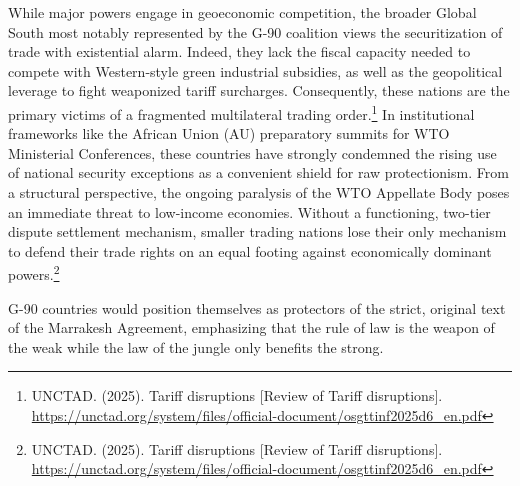 While major powers engage in geoeconomic competition, the broader Global South most notably represented by the G-90 coalition views the securitization of trade with existential alarm. Indeed, they lack the fiscal capacity needed to compete with Western-style green industrial subsidies, as well as the geopolitical leverage to fight weaponized tariff surcharges. Consequently, these nations are the primary victims of a fragmented multilateral trading order.\footnote{UNCTAD. (2025). Tariff disruptions [Review of Tariff disruptions]. \url{https://unctad.org/system/files/official-document/osgttinf2025d6_en.pdf}} In institutional frameworks like the African Union (AU) preparatory summits for WTO Ministerial Conferences, these countries have strongly condemned the rising use of national security exceptions as a convenient shield for raw protectionism. From a structural perspective, the ongoing paralysis of the WTO Appellate Body poses an immediate threat to low-income economies. Without a functioning, two-tier dispute settlement mechanism, smaller trading nations lose their only mechanism to defend their trade rights on an equal footing against economically dominant powers.\footnote{UNCTAD. (2025). Tariff disruptions [Review of Tariff disruptions]. \url{https://unctad.org/system/files/official-document/osgttinf2025d6_en.pdf}}

G-90 countries would position themselves as protectors of the strict, original text of the Marrakesh Agreement, emphasizing that the rule of law is the weapon of the weak while the law of the jungle only benefits the strong.
